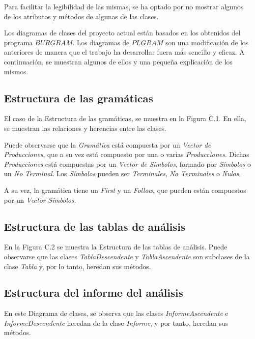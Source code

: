 Para facilitar la legibilidad de las mismas, se ha optado por no mostrar algunos de los atributos y métodos de algunas de las clases.

Los diagramas de clases del proyecto actual están basados en los obtenidos del programa $BURGRAM$. Los diagramas de $PLGRAM$ son una modificación de los anteriores de manera que el trabajo ha desarrollar fuera más sencillo y eficaz. A continuación, se muestran algunos de ellos y una pequeña explicación de los mismos.

\subsection{Estructura de las gramáticas}
El caso de la Estructura de las gramáticas, se muestra en la Figura C.1. En ella, se muestran las relaciones y herencias entre las clases.

Puede observarse que la \textit{Gramática} está compuesta por un \textit{Vector de Producciones}, que a su vez está compuesto por una o varias \textit{Producciones}. Dichas \textit{Producciones} está compuestas por un \textit{Vector de Símbolos}, formado por \textit{Símbolos} o un \textit{No Terminal}. Los \textit{Símbolos} pueden ser \textit{Terminales}, \textit{No Terminales} o \textit{Nulos}.

A su vez, la gramática tiene un \textit{First} y un \textit{Follow}, que pueden están compuestos por un \textit{Vector Símbolos}.


\subsection{Estructura de las tablas de análisis}

En la Figura C.2 se muestra la Estructura de las tablas de análisis. Puede observarse que las clases \textit{TablaDescendente} y \textit{TablaAscendente} son subclases de la clase \textit{Tabla} y, por lo tanto, heredan sus métodos.


\subsection{Estructura del informe del análisis}

En este Diagrama de clases, se observa que las clases \textit{InformeAscendente} e \textit{InformeDescendente} heredan de la clase \textit{Informe}, y por tanto, heredan sus métodos.

